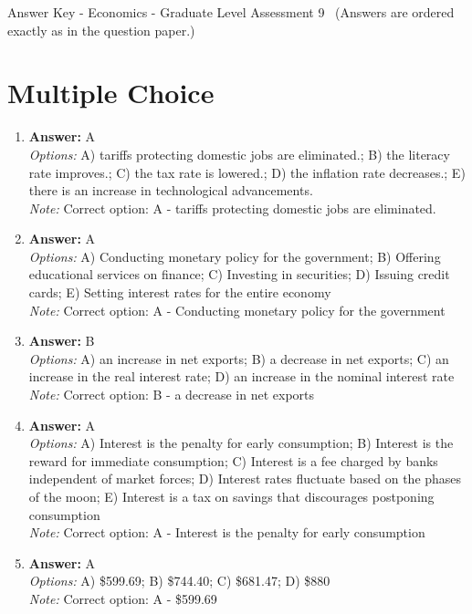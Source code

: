 \documentclass[12pt]{article}
\begin{document}
\begin{center}
Answer Key - Economics - Graduate Level Assessment 9 \
\small (Answers are ordered exactly as in the question paper.)
\end{center}

\section*{Multiple Choice}
\begin{enumerate}[label=\arabic*.]
\item \textbf{Answer:} A
\\ \textit{Options:} A) tariffs protecting domestic jobs are eliminated.; B) the literacy rate improves.; C) the tax rate is lowered.; D) the inflation rate decreases.; E) there is an increase in technological advancements.
\\ \textit{Note:} Correct option: A - tariffs protecting domestic jobs are eliminated.
\item \textbf{Answer:} A
\\ \textit{Options:} A) Conducting monetary policy for the government; B) Offering educational services on finance; C) Investing in securities; D) Issuing credit cards; E) Setting interest rates for the entire economy
\\ \textit{Note:} Correct option: A - Conducting monetary policy for the government
\item \textbf{Answer:} B
\\ \textit{Options:} A) an increase in net exports; B) a decrease in net exports; C) an increase in the real interest rate; D) an increase in the nominal interest rate
\\ \textit{Note:} Correct option: B - a decrease in net exports
\item \textbf{Answer:} A
\\ \textit{Options:} A) Interest is the penalty for early consumption; B) Interest is the reward for immediate consumption; C) Interest is a fee charged by banks independent of market forces; D) Interest rates fluctuate based on the phases of the moon; E) Interest is a tax on savings that discourages postponing consumption
\\ \textit{Note:} Correct option: A - Interest is the penalty for early consumption
\item \textbf{Answer:} A
\\ \textit{Options:} A) \$599.69; B) \$744.40; C) \$681.47; D) \$880
\\ \textit{Note:} Correct option: A - \$599.69
\end{enumerate}
\end{document}
